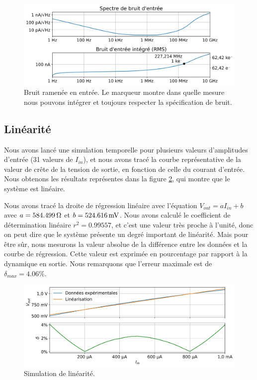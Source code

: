 \documentclass[a4paper,12pt]{article}
\numberwithin{equation}{section}
\newcommand{\?}{\stackrel{?}{=}}
\newcommand{\sis}[2]{\complexnum{#1}\,\si[per-mode=symbol]{#2}}
\begin{document}
\begin{figure}[htp!]
    \centering
    \includegraphics[width=\linewidth]{images/input_noise.png}
    \caption{Bruit ramenée en entrée. Le marqueur montre dans quelle mesure nous pouvons intégrer et toujours respecter la spécification de bruit.}
    \label{fig:input_noise}
\end{figure}

\subsection{Linéarité}

Nous avons lancé une simulation temporelle pour plusieurs valeurs d'amplitudes d'entrée (31 valeurs de $I_{in}$), et nous avons tracé la courbe représentative de la valeur de crête de la tension de sortie, en fonction de celle du courant d'entrée. Nous obtenons les résultats représentes dans la figure \ref{fig:lin_test}, qui montre que le système est linéaire.

Nous avons tracé la droite de régression linéaire avec l'équation $V_{out}=aI_{in}+b$ avec $a=\sis{584.499}{\ohm}$ et $b=\sis{524.616}{\milli\volt}$. Nous avons calculé le coefficient de détermination linéaire $r^2=\num{0.99557}$, et c'est une valeur très proche à l'unité, donc on peut dire que le système présente un degré important de linéarité. Mais pour être sûr, nous mesurons la valeur absolue de la différence entre les données et la courbe de régression. Cette valeur est exprimée en pourcentage par rapport à la dynamique en sortie. Nous remarquons que l'erreur maximale est de $\delta_{max}=\num{4.06}\%$. 


\begin{figure}[htp!]
    \centering
    \includegraphics[width=\linewidth]{images/lin_test.png}
    \caption{Simulation de linéarité.}
    \label{fig:lin_test}
\end{figure}
\end{document}
